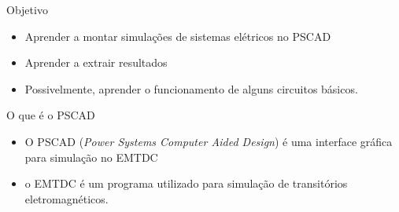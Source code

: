 





\begin{frame}{Objetivo}
\centering

\begin{itemize}
\item Aprender a montar simulações de sistemas elétricos no PSCAD 
\vspace*{1cm}
\item Aprender a extrair resultados
\vspace*{1cm}
\item Possivelmente, aprender o funcionamento de alguns circuitos básicos.
\vspace*{1cm}
\end{itemize}

\end{frame}






\begin{frame}{O que é o PSCAD}
\centering

\begin{itemize}
\item O PSCAD ({\it Power Systems Computer Aided Design}) é uma interface gráfica para simulação no EMTDC

\vspace*{2cm}

\item o EMTDC é um programa utilizado para simulação de transitórios eletromagnéticos.
\end{itemize}

\end{frame}





